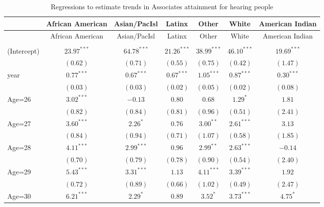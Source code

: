 \documentclass[fullpage]{paper}
\begin{document}
\begin{center}
\begin{longtable}{l c c c c c c }
\hline
 & African American & Asian/PacIsl & Latinx & Other & White & American Indian \\
\hline
\endfirsthead
\hline
 & African American & Asian/PacIsl & Latinx & Other & White & American Indian \\
\hline
\endhead
\hline
\endfoot
\hline
\multicolumn{7}{l}{\scriptsize{$^{***}p<0.001$, $^{**}p<0.01$, $^*p<0.05$}}\\
\caption{Regressions to estimate trends in Associates attainment for hearing people}
\label{table:coefficients}
\endlastfoot
(Intercept) & $23.97^{***}$ & $64.78^{***}$  & $21.26^{***}$ & $38.99^{***}$  & $46.10^{***}$  & $19.69^{***}$ \\
            & $(0.62)$      & $(0.71)$       & $(0.55)$      & $(0.75)$       & $(0.42)$       & $(1.47)$      \\
year        & $0.77^{***}$  & $0.67^{***}$   & $0.67^{***}$  & $1.05^{***}$   & $0.87^{***}$   & $0.30^{***}$  \\
            & $(0.03)$      & $(0.03)$       & $(0.02)$      & $(0.05)$       & $(0.02)$       & $(0.08)$      \\
Age=26      & $3.02^{***}$  & $-0.13$        & $0.80$        & $0.68$         & $1.29^{*}$     & $1.81$        \\
            & $(0.82)$      & $(0.84)$       & $(0.81)$      & $(0.96)$       & $(0.51)$       & $(2.41)$      \\
Age=27      & $3.60^{***}$  & $2.26^{*}$     & $0.76$        & $3.00^{**}$    & $2.61^{***}$   & $3.13$        \\
            & $(0.84)$      & $(0.94)$       & $(0.71)$      & $(1.07)$       & $(0.58)$       & $(1.85)$      \\
Age=28      & $4.11^{***}$  & $2.99^{***}$   & $0.96$        & $2.99^{**}$    & $2.63^{***}$   & $-0.14$       \\
            & $(0.70)$      & $(0.79)$       & $(0.78)$      & $(0.90)$       & $(0.54)$       & $(2.40)$      \\
Age=29      & $5.43^{***}$  & $3.31^{***}$   & $1.13$        & $4.11^{***}$   & $3.39^{***}$   & $1.92$        \\
            & $(0.72)$      & $(0.89)$       & $(0.66)$      & $(1.02)$       & $(0.49)$       & $(2.47)$      \\
Age=30      & $6.21^{***}$  & $2.29^{*}$     & $0.89$        & $3.52^{*}$     & $3.73^{***}$   & $4.75^{*}$    \\

\end{longtable}
\end{center}
\end{document}
